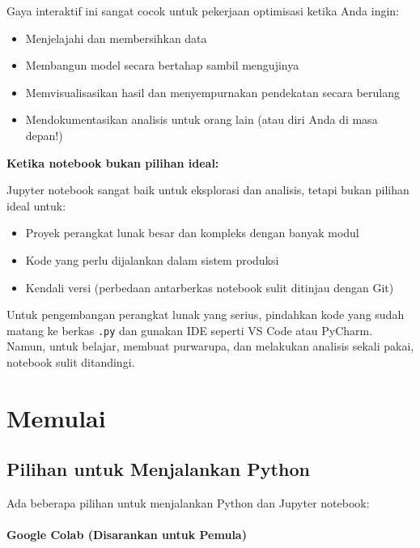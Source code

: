 Gaya interaktif ini sangat cocok untuk pekerjaan optimisasi ketika Anda ingin:
\begin{itemize}
\item Menjelajahi dan membersihkan data
\item Membangun model secara bertahap sambil mengujinya
\item Memvisualisasikan hasil dan menyempurnakan pendekatan secara berulang
\item Mendokumentasikan analisis untuk orang lain (atau diri Anda di masa depan!)
\end{itemize}

\begin{warn}
\textbf{Ketika notebook bukan pilihan ideal:}

Jupyter notebook sangat baik untuk eksplorasi dan analisis, tetapi bukan pilihan ideal untuk:
\begin{itemize}
\item Proyek perangkat lunak besar dan kompleks dengan banyak modul
\item Kode yang perlu dijalankan dalam sistem produksi
\item Kendali versi (perbedaan antarberkas notebook sulit ditinjau dengan Git)
\end{itemize}

Untuk pengembangan perangkat lunak yang serius, pindahkan kode yang sudah matang ke berkas \texttt{.py} dan gunakan IDE seperti VS Code atau PyCharm. Namun, untuk belajar, membuat purwarupa, dan melakukan analisis sekali pakai, notebook sulit ditandingi.
\end{warn}

\section{Memulai}

\subsection{Pilihan untuk Menjalankan Python}

Ada beberapa pilihan untuk menjalankan Python dan Jupyter notebook:

\paragraph{Google Colab (Disarankan untuk Pemula)}

